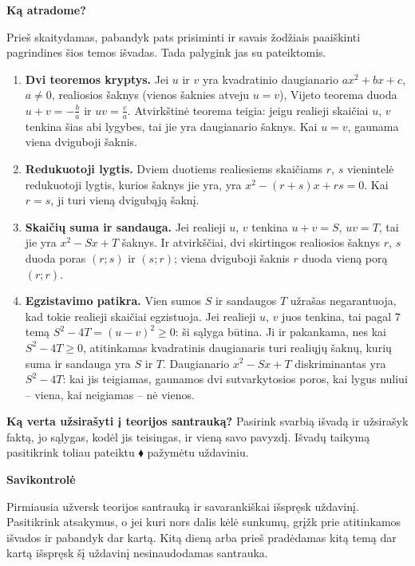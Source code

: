 \documentclass[12pt,a4paper]{article}
\begin{document}
\newpage
\begin{center}{\Large\bfseries Ką atradome?}\end{center}
Prieš skaitydamas, pabandyk pats prisiminti ir savais žodžiais paaiškinti pagrindines šios temos išvadas. Tada palygink jas su pateiktomis.
\begin{tcolorbox}[title=Svarbiausios temos išvados,colback=black!3,colframe=black!65,boxrule=0.6pt,arc=2mm]
\begin{enumerate}
\item \textbf{Dvi teoremos kryptys.} Jei $u$ ir $v$ yra kvadratinio daugianario $ax^2+bx+c$, $a\ne0$, realiosios šaknys (vienos šaknies atveju $u=v$), Vijeto teorema duoda $u+v=-\frac ba$ ir $uv=\frac ca$. Atvirkštinė teorema teigia: jeigu realieji skaičiai $u$, $v$ tenkina šias abi lygybes, tai jie yra daugianario šaknys. Kai $u=v$, gaunama viena dviguboji šaknis.
\item \textbf{Redukuotoji lygtis.} Dviem duotiems realiesiems skaičiams $r$, $s$ vienintelė redukuotoji lygtis, kurios šaknys jie yra, yra $x^2-(r+s)x+rs=0$. Kai $r=s$, ji turi vieną dvigubąją šaknį.
\item \textbf{Skaičių suma ir sandauga.} Jei realieji $u$, $v$ tenkina $u+v=S$, $uv=T$, tai jie yra $x^2-Sx+T$ šaknys. Ir atvirkščiai, dvi skirtingos realiosios šaknys $r$, $s$ duoda poras $(r;s)$ ir $(s;r)$; viena dviguboji šaknis $r$ duoda vieną porą $(r;r)$.
\item \textbf{Egzistavimo patikra.} Vien sumos $S$ ir sandaugos $T$ užrašas negarantuoja, kad tokie realieji skaičiai egzistuoja. Jei realieji $u$, $v$ juos tenkina, tai pagal 7 temą $S^2-4T=(u-v)^2\ge0$: ši sąlyga būtina. Ji ir pakankama, nes kai $S^2-4T\ge0$, atitinkamas kvadratinis daugianaris turi realiųjų šaknų, kurių suma ir sandauga yra $S$ ir $T$. Daugianario $x^2-Sx+T$ diskriminantas yra $S^2-4T$: kai jis teigiamas, gaunamos dvi sutvarkytosios poros, kai lygus nuliui – viena, kai neigiamas – nė vienos.
\end{enumerate}
\end{tcolorbox}
\textbf{Ką verta užsirašyti į teorijos santrauką?} Pasirink svarbią išvadą ir užsirašyk faktą, jo sąlygas, kodėl jis teisingas, ir vieną savo pavyzdį. Išvadų taikymą pasitikrink toliau pateiktu $\blacklozenge$ pažymėtu uždaviniu.
\newpage
\begin{center}{\Large\bfseries Savikontrolė}\end{center}
Pirmiausia užversk teorijos santrauką ir savarankiškai išspręsk uždavinį. Pasitikrink atsakymus, o jei kuri nors dalis kėlė sunkumų, grįžk prie atitinkamos išvados ir pabandyk dar kartą. Kitą dieną arba prieš pradėdamas kitą temą dar kartą išspręsk šį uždavinį nesinaudodamas santrauka.
\end{document}
